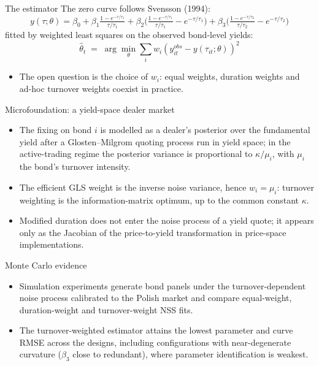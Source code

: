\documentclass[aspectratio=169,11pt]{beamer}
\begin{document}
\begin{frame}{The estimator}
  \small The zero curve follows Svensson (1994):
  \[ y(\tau;\theta) = \beta_0
     + \beta_1 \tfrac{1-e^{-\tau/\tau_1}}{\tau/\tau_1}
     + \beta_2 \Big( \tfrac{1-e^{-\tau/\tau_1}}{\tau/\tau_1} - e^{-\tau/\tau_1} \Big)
     + \beta_3 \Big( \tfrac{1-e^{-\tau/\tau_2}}{\tau/\tau_2} - e^{-\tau/\tau_2} \Big) \]
  fitted by weighted least squares on the observed bond-level yields:
  \[ \hat\theta_t \;=\; \arg\min_\theta \sum_{i}
     w_i \left( y^{obs}_{it} - y(\tau_{it};\theta) \right)^2 \]
  \begin{itemize}
    \item The open question is the choice of $w_i$: equal weights, duration
          weights and ad-hoc turnover weights coexist in practice.
  \end{itemize}
\end{frame}

\begin{frame}{Microfoundation: a yield-space dealer market}
  \begin{itemize}
    \item The fixing on bond $i$ is modelled as a dealer's posterior over the
          fundamental yield after a Glosten--Milgrom quoting process run in
          yield space; in the active-trading regime the posterior variance is
          proportional to $\kappa/\mu_i$, with $\mu_i$ the bond's turnover
          intensity.
    \item The efficient GLS weight is the inverse noise variance, hence
          \( w_i = \mu_i \): turnover weighting is the information-matrix
          optimum, up to the common constant $\kappa$.
    \item Modified duration does not enter the noise process of a yield
          quote; it appears only as the Jacobian of the price-to-yield
          transformation in price-space implementations.
  \end{itemize}
\end{frame}

\begin{frame}{Monte Carlo evidence}
  \begin{itemize}
    \item Simulation experiments generate bond panels under the
          turnover-dependent noise process calibrated to the Polish market
          and compare equal-weight, duration-weight and turnover-weight NSS
          fits.
    \item The turnover-weighted estimator attains the lowest parameter and
          curve RMSE across the designs, including configurations with
          near-degenerate curvature ($\beta_3$ close to redundant), where
          parameter identification is weakest.
  \end{itemize}
\end{frame}
\end{document}
